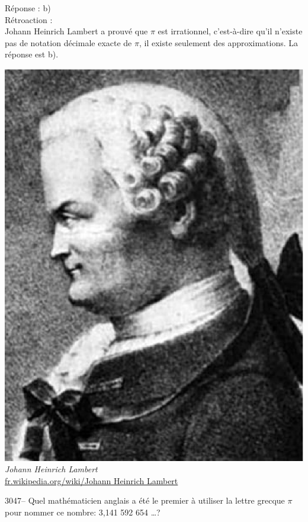 \documentclass[letterpaper, 12pt]{article}
\begin{document}
R\'eponse : b)\\

R\'etroaction :\\
Johann Heinrich Lambert a prouv\'e que $\pi$ est irrationnel, c'est-\`a-dire qu'il n'existe pas de notation d\'ecimale exacte de $\pi$, il existe seulement des approximations. La r\'eponse est b).\\
\begin{center}
\includegraphics[scale=0.25]{JHLambert.eps}\\
\emph{{\small Johann Heinrich Lambert}}\\
\href{http://fr.wikipedia.org/wiki/Johann Heinrich Lambert}{fr.wikipedia.org/wiki/Johann Heinrich Lambert}\\[5mm]
\end{center}



3047-- Quel math\'ematicien anglais a \'et\'e le premier \`a utiliser la lettre grecque $\pi$ pour nommer ce nombre: 3,141 592 654 \dots ?\\
\end{document}
